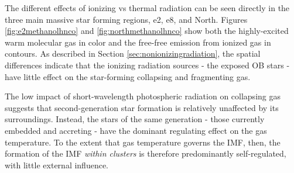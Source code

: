 \documentclass{emulateapj}
\begin{document}
The different effects of ionizing vs thermal radiation can be seen directly in
the three main massive star forming regions, e2, e8, and North.  Figures
\ref{fig:e2methanolhnco} and \ref{fig:northmethanolhnco} show both the
highly-excited warm molecular gas in color and the free-free emission from
ionized gas in contours.  As described in Section
\ref{sec:nonionizingradiation}, the spatial differences indicate that the
ionizing radiation sources - the exposed OB stars - have little effect on the
star-forming collapsing and fragmenting gas.

The low impact of short-wavelength photospheric radiation on collapsing gas
suggests that second-generation star formation is relatively unaffected by its
surroundings.  Instead, the stars of the same generation - those currently
embedded and accreting - have the dominant regulating effect on the gas
temperature.  To the extent that gas temperature governs the IMF, then, the
formation of the IMF \emph{within clusters} is therefore predominantly
self-regulated, with little external influence.




\end{document}

